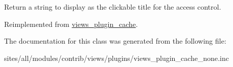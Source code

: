 Return a string to display as the clickable title for the access control. 

Reimplemented from \hyperlink{classviews__plugin__cache_35e5232e39c8148476328e302787d16b}{views\_\-plugin\_\-cache}.

The documentation for this class was generated from the following file:\begin{CompactItemize}
\item 
sites/all/modules/contrib/views/plugins/views\_\-plugin\_\-cache\_\-none.inc\end{CompactItemize}
